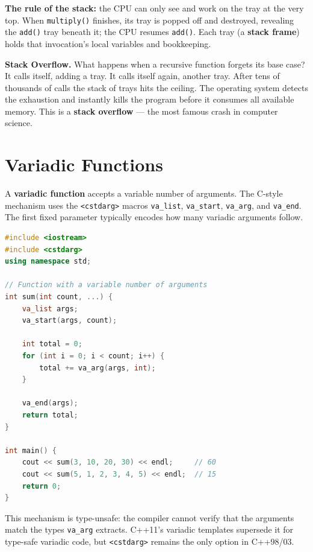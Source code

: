 \textbf{The rule of the stack:} the CPU can only see and work on the tray at the very top. When \texttt{multiply()} finishes, its tray is popped off and destroyed, revealing the \texttt{add()} tray beneath it; the CPU resumes \texttt{add()}. Each tray (a \textbf{stack frame}) holds that invocation's local variables and bookkeeping.

\textbf{Stack Overflow.} What happens when a recursive function forgets its base case? It calls itself, adding a tray. It calls itself again, another tray. After tens of thousands of calls the stack of trays hits the ceiling. The operating system detects the exhaustion and instantly kills the program before it consumes all available memory. This is a \textbf{stack overflow} --- the most famous crash in computer science.

\section{Variadic Functions}
\label{sec:variadic-functions}

A \textbf{variadic function} accepts a variable number of arguments. The C-style mechanism uses the \texttt{<cstdarg>} macros \texttt{va\_list}, \texttt{va\_start}, \texttt{va\_arg}, and \texttt{va\_end}. The first fixed parameter typically encodes how many variadic arguments follow.

\begin{lstlisting}[language=C++, caption={A variadic sum using <cstdarg>}]
#include <iostream>
#include <cstdarg>
using namespace std;

// Function with a variable number of arguments
int sum(int count, ...) {
    va_list args;
    va_start(args, count);

    int total = 0;
    for (int i = 0; i < count; i++) {
        total += va_arg(args, int);
    }

    va_end(args);
    return total;
}

int main() {
    cout << sum(3, 10, 20, 30) << endl;     // 60
    cout << sum(5, 1, 2, 3, 4, 5) << endl;  // 15
    return 0;
}
\end{lstlisting}

This mechanism is type-unsafe: the compiler cannot verify that the arguments match the types \texttt{va\_arg} extracts. C++11's variadic templates supersede it for type-safe variadic code, but \texttt{<cstdarg>} remains the only option in C++98/03.

